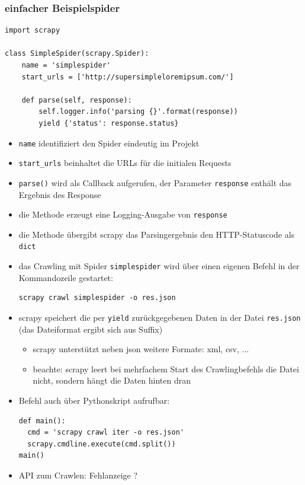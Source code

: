 \documentclass{beamer}
\begin{document}
\begin{frame}
	\frametitle{einfacher Beispielspider}
			\begin{lstlisting}
import scrapy

class SimpleSpider(scrapy.Spider):
    name = 'simplespider'
    start_urls = ['http://supersimpleloremipsum.com/']

    def parse(self, response):
        self.logger.info('parsing {}'.format(response))
        yield {'status': response.status}
			\end{lstlisting}
			
	\framebreak
	
	\begin{itemize}
		\item \lstinline|name| identifiziert den Spider eindeutig im Projekt
		\item \lstinline|start_urls| beinhaltet die URLs für die initialen Requests
		\item \lstinline|parse()| wird als Callback aufgerufen, der Parameter \lstinline|response| enthält das Ergebnis des Response
		\item die Methode erzeugt eine Logging-Ausgabe von \lstinline|response| 
		\item die Methode übergibt scrapy das Parsingergebnis den HTTP-Statuscode als \lstinline|dict|
	\end{itemize}
	
	\framebreak
	
	\begin{itemize}
		\item das Crawling mit Spider \lstinline|simplespider| wird über einen eigenen Befehl in der Kommandozeile gestartet:
			\begin{lstlisting}
scrapy crawl simplespider -o res.json
			\end{lstlisting}
		\item scrapy speichert die per \lstinline|yield| zurückgegebenen Daten in der Datei \lstinline|res.json| (das Dateiformat ergibt sich aus Suffix) \begin{itemize}
			\item scrapy unterstützt neben json weitere Formate: xml, csv, ... 
			\item beachte: scrapy leert bei mehrfachem Start des Crawlingbefehls die Datei nicht, sondern hängt die Daten hinten dran
		\end{itemize}
		\item Befehl auch über Pythonskript aufrufbar: \begin{lstlisting}
def main():
  cmd = 'scrapy crawl iter -o res.json'
  scrapy.cmdline.execute(cmd.split())
main()		
		\end{lstlisting}
		\item API zum Crawlen: Fehlanzeige ?
	\end{itemize}
\end{frame}
\end{document}
